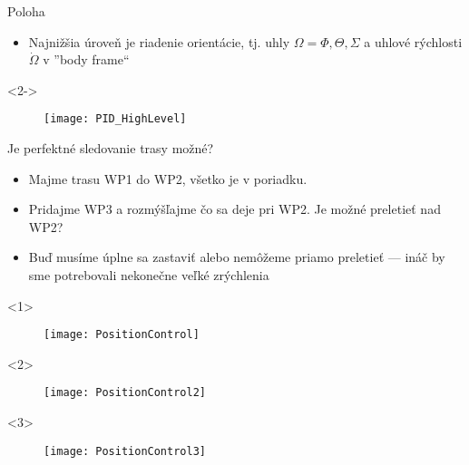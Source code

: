 \documentclass{beamer}
\begin{document}
\begin{frame}[t]{Poloha}
\begin{itemize}
  \item<1-> Najnižšia úroveň je riadenie orientácie, tj. uhly $\Omega={\Phi, \Theta, \Sigma}$ a uhlové rýchlosti $\dot\Omega$ v ''body frame``
\end{itemize}

  \begin{onlyenv}<2->
\begin{figure}
\centering
  \texttt{[image: PID\_HighLevel]}\\
\end{figure}
\end{onlyenv}


\end{frame}




\begin{frame}{Je perfektné sledovanie trasy možné?}
\begin{itemize}
\item<1-> Majme trasu WP1 do WP2, všetko je v poriadku.
\item<2-> Pridajme WP3 a rozmýšľajme čo sa deje pri WP2. Je možné preletieť nad WP2?
\item<3-> Buď musíme úplne sa zastaviť alebo nemôžeme priamo preletieť --- ináč by sme potrebovali nekonečne veľké zrýchlenia
\end{itemize}

\begin{onlyenv}<1>
  \begin{figure}
\centering
  \texttt{[image: PositionControl]}\\
\end{figure}
\end{onlyenv}

\begin{onlyenv}<2>
  \begin{figure}
\centering
  \texttt{[image: PositionControl2]}\\
\end{figure}
\end{onlyenv}

\begin{onlyenv}<3>
  \begin{figure}
\centering
  \texttt{[image: PositionControl3]}\\
\end{figure}
\end{onlyenv}


\end{frame}
\end{document}
